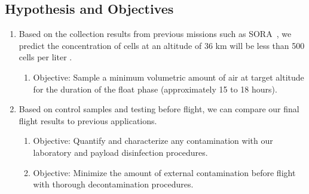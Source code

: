 \subsection{Hypothesis and Objectives}
\label{subsec:Hypothesis-Objectives}
\begin{enumerate}
\item Based on the collection results from previous missions such as SORA~\cite{SORA}, we predict the concentration of cells at an altitude of 36 km will be less than 500 cells per liter \citep{LSU}.
	\begin{enumerate}
	\item Objective: Sample a minimum volumetric amount of air at target altitude for the duration of the float phase (approximately 15 to 18 hours).
	\end{enumerate}
\item Based on control samples and testing before flight, we can compare our final flight results to previous applications.
	\begin{enumerate}
	\item Objective: Quantify and characterize any contamination with our laboratory and payload disinfection procedures.
	\item Objective: Minimize the amount of external contamination before flight with thorough decontamination procedures.
	\end{enumerate}

\end{enumerate}
